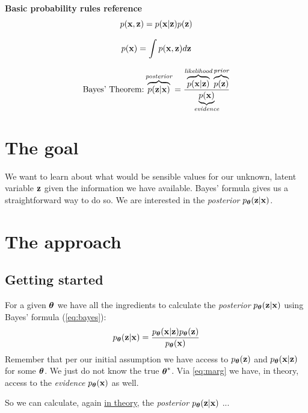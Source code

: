 \documentclass[11pt]{article}
\theoremstyle{definition}
\begin{document}
\pagebreak

\begin{mdframed}
	{\Large \bf Basic probability rules reference}
		\begin{equation}
			p(\mathbf{x}, \mathbf{z}) = p(\mathbf{x}|\mathbf{z})p(\mathbf{z})
			\label{eq:joint}
		\end{equation}
		
		\begin{equation}
			p(\mathbf{x}) = \int p(\mathbf{x}, \mathbf{z}) d\mathbf{z}
			\label{eq:marg}
		\end{equation}
		
		\begin{equation}
		\text{Bayes' Theorem:} \overbrace{p(\mathbf{z}|\mathbf{x})}^{\textit{posterior}}=\frac{\overbrace{p(\mathbf{x}|\mathbf{z})}^{\textit{likelihood}}\overbrace{p(\mathbf{z})}^{\textit{prior}}}{\underbrace{p(\mathbf{x})}_{\textit{evidence}}}
		\label{eq:bayes}
		\end{equation}
\end{mdframed}


\section{The goal}
We want to learn about what would be sensible values for our unknown, latent variable $\mathbf{z}$ given the information we have available. Bayes' formula gives us a straightforward way to do so. We are interested in the \textit{posterior} $p_{\boldsymbol{\theta}}(\mathbf{z}|\mathbf{x})$.

\section{The approach}
\subsection{Getting started}
For a given $\boldsymbol{\theta}$ we have all the ingredients to calculate the \textit{posterior} $p_{\boldsymbol{\theta}}(\mathbf{z}|\mathbf{x})$ using Bayes' formula (\autoref{eq:bayes}):
\begin{equation}
	p_{\boldsymbol{\theta}}(\mathbf{z}|\mathbf{x})=\frac{p_{\boldsymbol{\theta}}(\mathbf{x}|\mathbf{z})p_{\boldsymbol{\theta}}(\mathbf{z})}{p_{\boldsymbol{\theta}}(\mathbf{x})}
	\label{eq:bayes-post-theta}
\end{equation}
Remember that per our initial assumption we have access to $p_{\boldsymbol{\theta}}(\mathbf{z})$ and $p_{\boldsymbol{\theta}}(\mathbf{x}|\mathbf{z})$ for some $\boldsymbol{\theta}$. We just do not know the true $\boldsymbol{\theta}^*$. Via \autoref{eq:marg} we have, in theory, access to the \textit{evidence} $p_{\boldsymbol{\theta}}(\mathbf{x})$ as well.
\par
So we can calculate, again \underline{in theory}, the \textit{posterior} $p_{\boldsymbol{\theta}}(\mathbf{z}|\mathbf{x})$ ...
\end{document}
